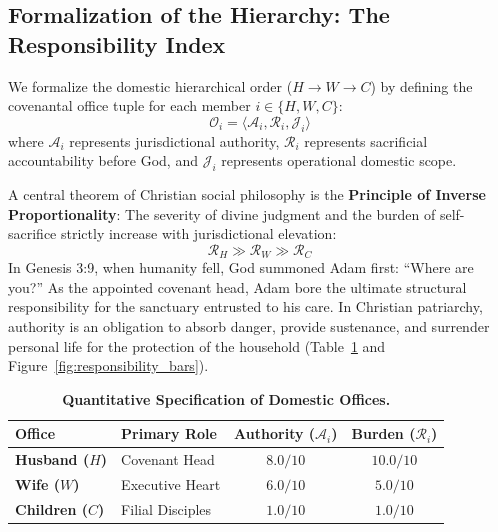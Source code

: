 \documentclass[11pt,twocolumn]{article}
\begin{document}
\subsection{Formalization of the Hierarchy: The Responsibility Index}
We formalize the domestic hierarchical order ($H \to W \to C$) by defining the covenantal office tuple for each member $i \in \{H, W, C\}$:
\begin{equation}
    \mathcal{O}_i = \langle \mathcal{A}_i, \mathcal{R}_i, \mathcal{J}_i \rangle
\end{equation}
where $\mathcal{A}_i$ represents jurisdictional authority, $\mathcal{R}_i$ represents sacrificial accountability before God, and $\mathcal{J}_i$ represents operational domestic scope.

A central theorem of Christian social philosophy is the \textbf{Principle of Inverse Proportionality}: The severity of divine judgment and the burden of self-sacrifice strictly increase with jurisdictional elevation:
\begin{equation}
    \mathcal{R}_H \gg \mathcal{R}_W \gg \mathcal{R}_C
\end{equation}
In Genesis 3:9, when humanity fell, God summoned Adam first: ``Where are you?'' As the appointed covenant head, Adam bore the ultimate structural responsibility for the sanctuary entrusted to his care. In Christian patriarchy, authority is an obligation to absorb danger, provide sustenance, and surrender personal life for the protection of the household (Table~\ref{tab:office_metrics} and Figure~\ref{fig:responsibility_bars}).

\begin{table}[H]
\centering
\caption{\textbf{Quantitative Specification of Domestic Offices.}}
\label{tab:office_metrics}
\scriptsize
\begin{tabular}{@{}llcc@{}}
\toprule
\textbf{Office} & \textbf{Primary Role} & \textbf{Authority ($\mathcal{A}_i$)} & \textbf{Burden ($\mathcal{R}_i$)} \\
\midrule
\textbf{Husband ($H$)} & Covenant Head & $8.0 / 10$ & $10.0 / 10$ \\
\textbf{Wife ($W$)} & Executive Heart & $6.0 / 10$ & $5.0 / 10$ \\
\textbf{Children ($C$)} & Filial Disciples & $1.0 / 10$ & $1.0 / 10$ \\
\bottomrule
\end{tabular}
\end{table}
\end{document}
